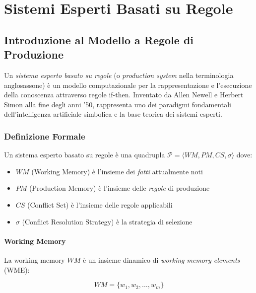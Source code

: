 
\chapter{Sistemi Esperti Basati su Regole}
\label{cap:sistemi_produzione}

\section{Introduzione al Modello a Regole di Produzione}

Un \textit{sistema esperto basato su regole} (o \textit{production system} nella terminologia anglosassone) è un modello computazionale per la rappresentazione e l'esecuzione della conoscenza attraverso regole if-then. Inventato da Allen Newell e Herbert Simon alla fine degli anni '50, rappresenta uno dei paradigmi fondamentali dell'intelligenza artificiale simbolica e la base teorica dei sistemi esperti.

\subsection{Definizione Formale}

\begin{definizione}
Un sistema esperto basato su regole è una quadrupla $\mathcal{P} = \langle WM, PM, CS, \sigma \rangle$ dove:
\begin{itemize}
\item $WM$ (Working Memory) è l'insieme dei \textit{fatti} attualmente noti
\item $PM$ (Production Memory) è l'insieme delle \textit{regole} di produzione
\item $CS$ (Conflict Set) è l'insieme delle regole applicabili
\item $\sigma$ (Conflict Resolution Strategy) è la strategia di selezione
\end{itemize}
\end{definizione}

\subsubsection{Working Memory}

La working memory $WM$ è un insieme dinamico di \textit{working memory elements} (WME):

\begin{equation}
WM = \{w_1, w_2, \ldots, w_m\}
\end{equation}

